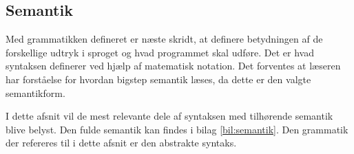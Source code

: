 \subsection{Semantik}\label{sec:Syntax}
Med grammatikken defineret er næste skridt, at definere betydningen af de forskellige udtryk i sproget og hvad programmet skal udføre. Det er hvad syntaksen definerer ved hjælp af matematisk notation. Det forventes at læseren har forståelse for hvordan bigstep semantik læses, da dette er den valgte semantikform. 

I dette afsnit vil de mest relevante dele af syntaksen med tilhørende semantik blive belyst. Den fulde semantik kan findes i bilag \ref{bil:semantik}. Den grammatik der refereres til i dette afsnit er den abstrakte syntaks.



%

